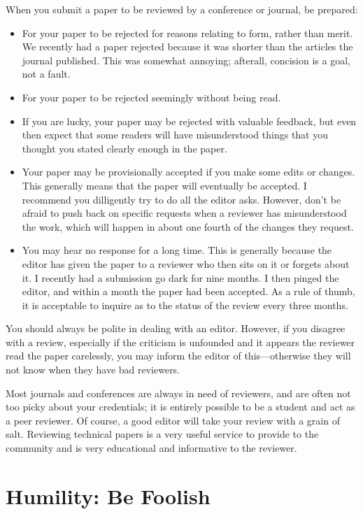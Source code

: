 \documentclass[
	fontsize=10pt, %
	twoside=false, %
	secnumdepth=1, %
]{kaobook}
\begin{document}
When you submit a paper to be reviewed by a conference or journal, be prepared:
\begin{itemize}
\item For your paper to be rejected for reasons relating to form, rather than merit.
  We recently had a paper rejected because it was shorter than the articles the journal published. This was somewhat annoying; afterall, concision
  is a goal, not a fault.
\item For your paper to be rejected seemingly without being read.
\item If you are lucky, your paper may be rejected with valuable feedback, but even then expect that some readers will have misunderstood things that you
  thought you stated clearly enough in the paper.
\item Your paper may be provisionally accepted if you make some edits or changes. This generally means that the paper will eventually be accepted.
  I recommend you dilligently try to do all the editor asks. However, don't be afraid to push back on specific requests when a reviewer has
  misunderstood the work, which will happen in about one fourth of the changes they request.
\item You may hear no response for a long time. This is generally because the editor has given the paper to a reviewer
  who then sits on it or forgets about it. I recently had a submission go dark for nine months.
  I then pinged the editor, and within a month the paper had been accepted. As a rule of thumb, it
  is acceptable to inquire as to the status of the review every three months.
\end{itemize}
You should always be polite in dealing with an editor. However, if you disagree with a review, especially if the criticism is unfounded
and it appears the reviewer read the paper carelessly, you may inform the editor of this---otherwise they will not know when they have bad reviewers.


Most journals and conferences are always in need of reviewers, and are often not too picky about your credentials;
it is entirely possible to be a student and act as a peer reviewer.
Of course, a good editor will take your review with a grain of salt.
Reviewing technical papers is a very useful service to provide to the community
and is very educational and informative to the reviewer.

\section{Humility: Be Foolish}
\end{document}
